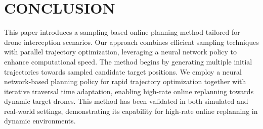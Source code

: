 \section{CONCLUSION}
This paper introduces a sampling-based online planning method tailored for drone interception scenarios. 
Our approach combines efficient sampling techniques with parallel trajectory optimization, leveraging a neural network policy to enhance computational speed. 
The method begins by generating multiple initial trajectories towards sampled candidate target positions. 
We employ a neural network-based planning policy for rapid trajectory optimization together with iterative traversal time adaptation, enabling high-rate online replanning towards dynamic target drones.
This method has been validated in both simulated and real-world settings, demonstrating its capability for high-rate online replanning in dynamic environments.